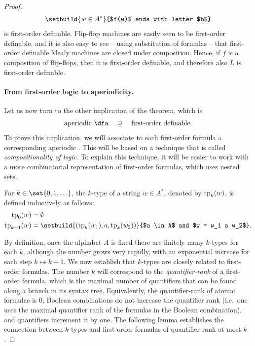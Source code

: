 \begin{proof}
    \begin{align*}
    \setbuild{ w \in A^*}{$f(w)$ ends with letter $b$}
    \end{align*} is first-order definable. Flip-flop machines are easily seen to be first-order definable, and it is also easy to see -- using substitution of formulas -- that first-order definable Mealy machines are closed under composition. Hence, if $f$ is a composition of flip-flops, then it is first-order definable, and therefore also $L$ is first-order definable.

    \newcommand{\equivclass}[2]{#1_{/#2}}

    \paragraph*{From first-order logic to aperiodicity.}
    Let us now turn to the other implication of the theorem, which is 
    \begin{align*}
    \text{aperiodic \dfa} \quad \supseteq \quad \text{first-order definable}.
    \end{align*}
    To prove this implication, we will associate to each first-order formula a corresponding aperiodic \dfa. This will be based on a technique that is called \emph{compositionality of logic}. 
    To explain this technique, it will be easier to work with a more combinatorial representation of first-order formulas, which uses nested sets.
    
    \begin{definition}[$k$-types]\label{def:k-types}
        For $k \in \set{0,1,\ldots}$, the $k$-type of a string $w \in A^*$, denoted by $\text{tp}_k(w)$, is defined inductively as follows:
    \begin{align*}
        \fotype_0(w) & = \emptyset \\
        \fotype_{k+1}(w) & = \setbuild{ (\fotype_k(w_1), a, \fotype_k(w_2))}{$a \in A$ and $w = w_1 a w_2$}.
    \end{align*}
    \end{definition}
By definition, once the alphabet $A$ is fixed there are finitely many $k$-types for each $k$, although the number grows very rapidly, with an exponential increase for each step $k \mapsto k+1$. We now establish that $k$-types are closely related to first-order formulas. The number $k$ will correspond to the  \emph{quantifier-rank} of a first-order formula, which is the  maximal number of quantifiers that can be found along a branch in its syntax tree. Equivalently, the quantifier-rank of atomic formulas is 0, Boolean combinations do not increase the quantifier rank (i.e.~one uses the maximal quantifier rank of the formulas in the Boolean combination), and quantifiers increment it by one. The following lemma establishes the connection between $k$-types and first-order formulas of quantifier rank at most $k$.



\end{proof}
